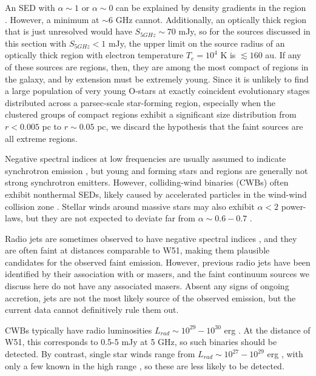 An SED with $\alpha\sim1$ or $\alpha\sim0$ can be explained by density
gradients in the \hii region \citep{Keto2008a,Galvan-Madrid2009a,Tanaka2015a}.
However, a minimum at $\sim6$ GHz cannot.  Additionally, an optically thick
\hii region that is just unresolved would have $S_{5 GHz} \sim 70$ mJy, so for
the sources discussed in this section with $S_{5 GHz} < 1$ mJy, the upper limit
on the source radius of an optically thick \hii region with electron
temperature $T_e=10^4$ K is $\lesssim160$ au.  If any of these sources are \hii
regions, then, they are among the most compact of \hchii regions in the galaxy,
and by extension must be extremely young.  Since it is unlikely to find a large
population of very young O-stars at exactly coincident evolutionary stages
distributed across a parsec-scale star-forming region, especially when the clustered
groups of compact \hii regions exhibit a significant size distribution from
$r<0.005$ pc to $r\sim0.05$ pc, we discard the hypothesis that the faint sources
are all extreme \hchii regions.

Negative spectral indices at low frequencies are usually assumed to indicate
synchrotron emission \citep{Wilson2009a,Condon2007a}, but young and forming
stars and \hii regions are generally not strong synchrotron emitters.  However,
colliding-wind binaries (CWBs) often exhibit nonthermal SEDs, likely caused by
accelerated particles in the wind-wind collision zone \citep{De-Becker2013a}.
Stellar winds around massive stars may also exhibit $\alpha<2$ power-laws, but
they are not expected to deviate far from $\alpha\sim0.6-0.7$
\citep{Wright1975a,Panagia1975b,Reynolds1986a}.

Radio jets are sometimes observed to have negative spectral indices
\citep{Moscadelli2013a,Moscadelli2016a}, and they are often faint at distances
comparable to W51, making them plausible candidates for the observed faint
emission.  However, previous radio jets have been identified by their
association with \methanol or \water masers, and the faint continuum sources we
discuss here do not have any associated masers.  Absent any signs of ongoing
accretion, jets are not the most likely source of the observed emission, but
the current data cannot definitively rule them out.

CWBs typically have radio luminosities
$L_{rad}\sim10^{29}-10^{30}$ erg \pers \citep{De-Becker2013a}.   At the
distance of W51, this corresponds to 0.5-5 mJy at 5 GHz, so such binaries
should be detected.  By contrast, single star winds range from $L_{rad} \sim
10^{27}-10^{29}$ erg \pers, with only a few known in the high range
\citep{Bieging1989a}, so these are less likely to be detected.

